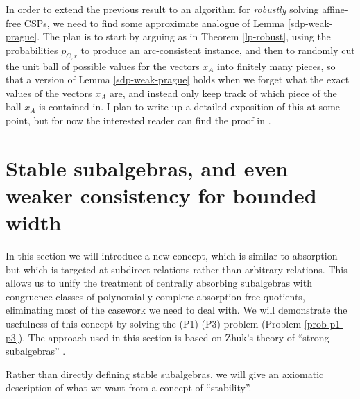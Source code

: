 In order to extend the previous result to an algorithm for \emph{robustly} solving affine-free CSPs, we need to find some approximate analogue of Lemma \ref{sdp-weak-prague}. The plan is to start by arguing as in Theorem \ref{lp-robust}, using the probabilities $p_{C,r}$ to produce an arc-consistent instance, and then to randomly cut the unit ball of possible values for the vectors $x_A$ into finitely many pieces, so that a version of Lemma \ref{sdp-weak-prague} holds when we forget what the exact values of the vectors $x_A$ are, and instead only keep track of which piece of the ball $x_A$ is contained in. I plan to write up a detailed exposition of this at some point, but for now the interested reader can find the proof in \cite{sdp}.%



\section{Stable subalgebras, and even weaker consistency for bounded width}

In this section we will introduce a new concept, which is similar to absorption but which is targeted at subdirect relations rather than arbitrary relations. This allows us to unify the treatment of centrally absorbing subalgebras with congruence classes of polynomially complete absorption free quotients, eliminating most of the casework we need to deal with. We will demonstrate the usefulness of this concept by solving the (P1)-(P3) problem (Problem \ref{prob-p1-p3}). The approach used in this section is based on Zhuk's theory of ``strong subalgebras'' \cite{zhuk-strong}.

Rather than directly defining stable subalgebras, we will give an axiomatic description of what we want from a concept of ``stability''.

